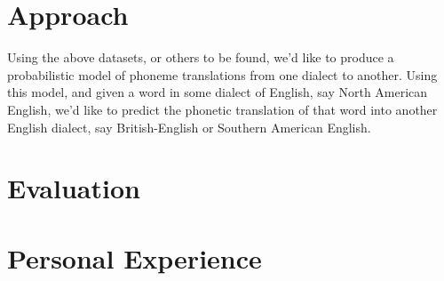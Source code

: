 \documentclass[11pt, letterpaper, oneside]{article}
\begin{document}
\section{Approach}
Using the above datasets, or others to be found, we'd like to produce a probabilistic model of phoneme translations from one dialect to another. Using this model, and given a word in some dialect of English, say North American English, we'd like to predict the phonetic translation of that word into another English dialect, say British-English or Southern American English.

\section{Evaluation}

\section{Personal Experience}
\end{document}
